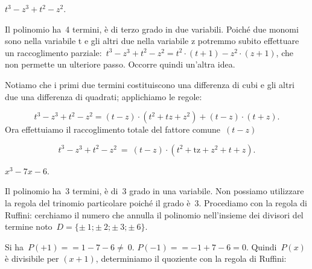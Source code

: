 \begin{exrig}
 \begin{esempio}
 $t^{{3}}-z^{{3}}+t^{2}-z^{2}$.

Il polinomio ha~4 termini, è di terzo grado in due variabili.
Poiché due monomi sono nella variabile t e gli altri due nella
variabile z potremmo subito effettuare un raccoglimento
parziale:~$t^{{3}}-z^{{3}}+t^{2}-z^{2}=
           t^{2}\cdot\left(t+1\right)-z^{2}\cdot \left(z+1\right)$,
che non permette un ulteriore passo. Occorre quindi un'altra idea.

Notiamo che i primi due termini costituiscono una differenza di cubi e
gli altri due una differenza di quadrati; applichiamo le regole:

\begin{equation*}
t^{{3}}-z^{{3}}+t^{2}-z^{2}=\left(t-z\right)\cdot
\left(t^{2}+tz+z^{2}\right)+\left(t-z\right)\cdot
\left(t+z\right).
\end{equation*}
Ora effettuiamo il raccoglimento totale del fattore comune~$(t-z)$

\begin{equation*}
t^{3}-z^{3}+t^{2}-z^{2}\ =\ \left(t-z\right)\cdot
\left(t^{2}+{\text{tz}}+z^{2}+t+z\right).
\end{equation*}
 \end{esempio}

 \begin{esempio}
 $x^{{3}}-7x-6$.

Il polinomio ha~3 termini, è di~3{\textdegree} grado in una variabile.
Non possiamo utilizzare la regola del trinomio particolare poiché il
grado è~3. Procediamo con la regola di Ruffini: cerchiamo il numero che annulla 
il polinomio nell'insieme dei divisori del termine
noto~$D=\{\pm~1;\pm~2;\pm~3;\pm~6\}$.

\begin{multicols}{2}
 Si ha~$P(+1)==1-7-6\neq~0$.
$P(-1)==-1+7-6=0$.
Quindi~$P(x)$ è divisibile per $\left(x+1\right)$, determiniamo 
il quoziente con la regola di Ruffini:

%  
\begin{inaccessibleblock}

\end{inaccessibleblock}


\end{multicols}
\end{esempio}
\end{exrig}
